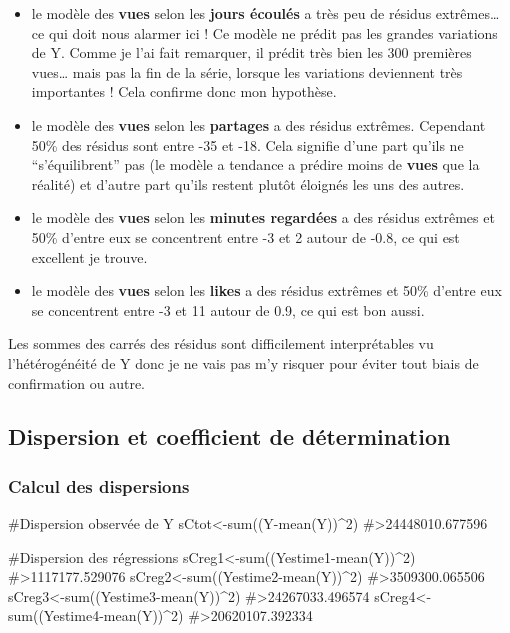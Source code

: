 \begin{itemize}
\tightlist
\item
  le modèle des \textbf{vues} selon les \textbf{jours écoulés} a très
  peu de résidus extrêmes\ldots{} ce qui doit nous alarmer ici ! Ce
  modèle ne prédit pas les grandes variations de Y. Comme je l'ai fait
  remarquer, il prédit très bien les 300 premières vues\ldots{} mais pas
  la fin de la série, lorsque les variations deviennent très importantes
  ! Cela confirme donc mon hypothèse.
\item
  le modèle des \textbf{vues} selon les \textbf{partages} a des résidus
  extrêmes. Cependant 50\% des résidus sont entre -35 et -18. Cela
  signifie d'une part qu'ils ne ``s'équilibrent'' pas (le modèle a
  tendance a prédire moins de \textbf{vues} que la réalité) et d'autre
  part qu'ils restent plutôt éloignés les uns des autres.
\item
  le modèle des \textbf{vues} selon les \textbf{minutes regardées} a des
  résidus extrêmes et 50\% d'entre eux se concentrent entre -3 et 2
  autour de -0.8, ce qui est excellent je trouve.
\item
  le modèle des \textbf{vues} selon les \textbf{likes} a des résidus
  extrêmes et 50\% d'entre eux se concentrent entre -3 et 11 autour de
  0.9, ce qui est bon aussi.
\end{itemize}

Les sommes des carrés des résidus sont difficilement interprétables vu
l'hétérogénéité de Y donc je ne vais pas m'y risquer pour éviter tout
biais de confirmation ou autre.

\hypertarget{dispersion-et-coefficient-de-duxe9termination}{%
\subsection{Dispersion et coefficient de
détermination}\label{dispersion-et-coefficient-de-duxe9termination}}

\hypertarget{calcul-des-dispersions}{%
\subsubsection{Calcul des dispersions}\label{calcul-des-dispersions}}

\begin{Schunk}
\begin{Sinput}
#Dispersion observée de Y
sCtot<-sum((Y-mean(Y))^2)
#>24448010.677596

#Dispersion des régressions
sCreg1<-sum((Yestime1-mean(Y))^2)
#>1117177.529076
sCreg2<-sum((Yestime2-mean(Y))^2)
#>3509300.065506
sCreg3<-sum((Yestime3-mean(Y))^2)
#>24267033.496574
sCreg4<-sum((Yestime4-mean(Y))^2)
#>20620107.392334
\end{Sinput}
\end{Schunk}


